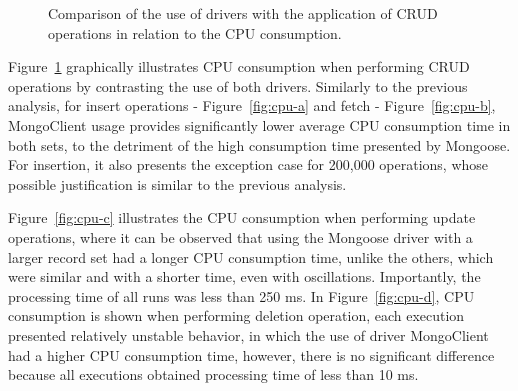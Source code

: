 \documentclass{svproc}
\begin{document}
\begin{figure}[!ht]
    \caption{Comparison of the use of drivers with the application of CRUD operations in relation to the CPU consumption.}
    \label{fig:cpuusage}
\end{figure}

Figure~\ref{fig:cpuusage} graphically illustrates CPU consumption when performing CRUD operations by contrasting the use of both drivers.
Similarly to the previous analysis, for insert operations - Figure~\ref{fig:cpu-a} and fetch - Figure~\ref{fig:cpu-b}, MongoClient usage provides significantly lower average CPU consumption time in both sets, to the detriment of the high consumption time presented by Mongoose. For insertion, it also presents the exception case for 200,000 operations, whose possible justification is similar to the previous analysis.

Figure~\ref{fig:cpu-c} illustrates the CPU consumption when performing update operations, where it can be observed that using the Mongoose driver with a larger record set had a longer CPU consumption time, unlike the others, which were similar and with a shorter time, even with oscillations.
Importantly, the processing time of all runs was less than 250 ms.
In Figure~\ref{fig:cpu-d}, CPU consumption is shown when performing deletion operation, each execution presented relatively unstable behavior, in which the use of driver MongoClient had a higher CPU consumption time, however, there is no significant difference because all executions obtained processing time of less than 10 ms.
\end{document}
